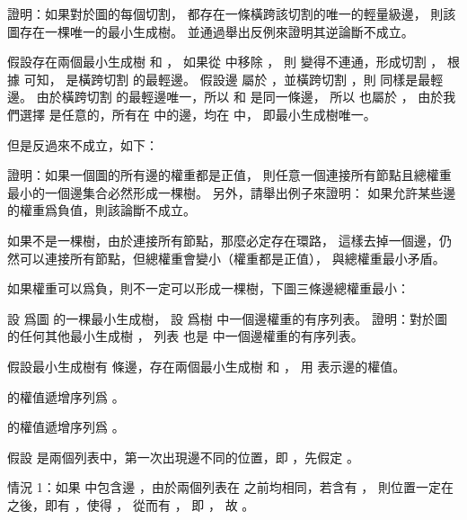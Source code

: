 \startANSWER
{}
\stopANSWER

\startEXERCISE
證明：如果對於圖的每個切割，
都存在一條橫跨該切割的唯一的輕量級邊，
則該圖存在一棵唯一的最小生成樹。
並通過舉出反例來證明其逆論斷不成立。
\stopEXERCISE

\startANSWER
假設存在兩個最小生成樹  和 ，
如果從  中移除 ，
則  變得不連通，形成切割 ，
根據 可知，  是橫跨切割  的最輕邊。
假設邊  屬於 ，並橫跨切割 ，則  同樣是最輕邊。
由於橫跨切割  的最輕邊唯一，所以  和  是同一條邊，
所以  也屬於 ，
由於我們選擇  是任意的，所有在  中的邊，均在  中，
即最小生成樹唯一。

但是反過來不成立，如下：

\externalfigure[output/e23_1_6-1]
\stopANSWER

\startEXERCISE
證明：如果一個圖的所有邊的權重都是正值，
則任意一個連接所有節點且總權重最小的一個邊集合必然形成一棵樹。
另外，請舉出例子來證明：
如果允許某些邊的權重爲負值，則該論斷不成立。
\stopEXERCISE

\startANSWER
如果不是一棵樹，由於連接所有節點，那麼必定存在環路，
這樣去掉一個邊，仍然可以連接所有節點，但總權重會變小（權重都是正值），
與總權重最小矛盾。

如果權重可以爲負，則不一定可以形成一棵樹，下圖三條邊總權重最小：

\externalfigure[output/e23_1_7-1]
\stopANSWER

\startEXERCISE
設  爲圖  的一棵最小生成樹，
設  爲樹  中一個邊權重的有序列表。
證明：對於圖  的任何其他最小生成樹 ，
列表  也是  中一個邊權重的有序列表。
\stopEXERCISE

\startANSWER
假設最小生成樹有  條邊，存在兩個最小生成樹  和 ，
用  表示邊的權值。

 的權值遞增序列爲 。

 的權值遞增序列爲 。

假設  是兩個列表中，第一次出現邊不同的位置，即 ，先假定 。

情況 1：如果  中包含邊 ，由於兩個列表在  之前均相同，若含有 ，
則位置一定在  之後，即有 ，使得 ，
從而有 ，
即 ，
故 。

